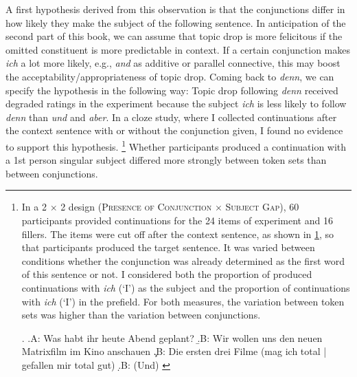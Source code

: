 A first hypothesis derived from this observation is that the conjunctions differ in how likely they make the subject of the following sentence.
In anticipation of the second part of this book, we can assume that topic drop is more felicitous if the omitted constituent is more predictable  in context.
If a certain conjunction makes \textit{ich} a lot more likely, e.g., \textit{and} as additive or parallel connective, this may boost the acceptability/appropriateness of topic drop.
Coming back to \textit{denn}, we can specify the hypothesis in the following way:
Topic drop following \textit{denn} received degraded ratings in the experiment because the subject \textit{ich} is less likely to follow \textit{denn} than \textit{und} and \textit{aber}.
In a cloze study,  where I collected continuations after the context sentence with or without the conjunction given, I found no evidence to support this hypothesis.%
\footnote{In a 2 $\times$ 2 design (\textsc{Presence of Conjunction} $\times$ \textsc{Subject Gap}), 60 participants provided continuations for the 24 items of experiment  and 16 fillers. 
The items were cut off after the context sentence, as shown in \ref{ex:conjunctions.cloze}, so that participants produced the target sentence.
It was varied between conditions whether the conjunction was already determined as the first word of this sentence or not.
I considered both the proportion of produced continuations with \textit{ich} (`I') as the subject and the proportion of continuations with \textit{ich} (`I') in the prefield.
For both measures, the variation between token sets was higher than the variation between conjunctions.

\ex.\label{ex:conjunctions.cloze}
\a.A: Was habt ihr heute Abend geplant?
\b.B: Wir wollen uns den neuen Matrixfilm im Kino anschauen
\c.B: Die ersten drei Filme (mag ich total | gefallen mir total gut)
\d.B: (Und) \underline{\phantom{wollen uns den neuen Matrixfilm im Kino anschauen}}
}
%
Whether participants produced a continuation with a 1st person singular subject differed more strongly between token sets than between conjunctions. 

